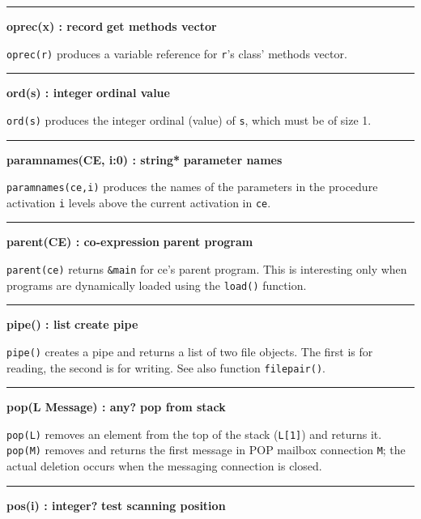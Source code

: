 \bigskip\hrule\vspace{0.1cm}
\noindent
{\bf oprec(x) : record } \hfill {\bf get methods vector}

\noindent
\texttt{oprec(r)} produces a variable reference for
\texttt{r}'s class' methods vector.

\bigskip\hrule\vspace{0.1cm}
\noindent
{\bf ord(s) : integer } \hfill {\bf ordinal value}

\noindent
{}\texttt{ord(s)} produces the integer ordinal
(value) of \texttt{s}, which must be of size 1.

\bigskip\hrule\vspace{0.1cm}
\noindent
{\bf paramnames(CE, i:0) : string* } \hfill {\bf parameter names}

\noindent
{}\texttt{paramnames(ce,i)} produces the names of
the parameters in the procedure activation \texttt{i} levels above the
current activation in \texttt{ce}.

\bigskip\hrule\vspace{0.1cm}
\noindent
{\bf parent(CE) : co{}-expression } \hfill {\bf parent program}

\noindent
\texttt{parent(ce)} returns \texttt{\&main} for ce's
parent program. This is interesting only when programs are dynamically
loaded using the \texttt{load()} function.

\bigskip\hrule\vspace{0.1cm}
\noindent
{\bf pipe() : list } \hfill {\bf create pipe}

\noindent
{}\texttt{pipe()} creates a pipe and returns a list of two
file objects. The first is for reading, the second is for writing. See
also function \texttt{filepair()}.

\bigskip\hrule\vspace{0.1cm}
\noindent
{\bf pop(L {\textbar} Message) : any? } \hfill {\bf pop from stack}\WarningNotThreadSafe

\noindent
{}\texttt{pop(L)} removes an element from the top of the
stack (\texttt{L[1]}) and returns it. \texttt{pop(M)}
removes and returns the first message in POP mailbox connection \texttt{M};
the actual deletion occurs when the messaging connection is closed.

\bigskip\hrule\vspace{0.1cm}
\noindent
{\bf pos(i) : integer? } \hfill {\bf test scanning position}

